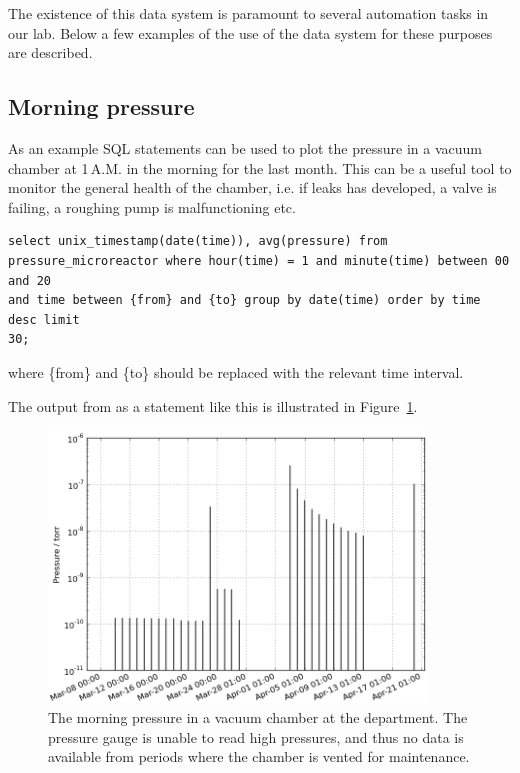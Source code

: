 The existence of this data system is paramount to several automation tasks
in our lab. Below a few examples of the use of the data system for
these purposes are described.

\subsection{Morning pressure}\label{sec:morning_pressure}

As an example SQL statements can be used to plot the pressure in a vacuum
chamber at 1\,A.M. in the morning for the last month. This can be a useful tool
to monitor the general health of the chamber, i.e. if leaks has developed, a
valve is failing, a roughing pump is malfunctioning etc.

\begin{verbatim} 
select unix_timestamp(date(time)), avg(pressure) from
pressure_microreactor where hour(time) = 1 and minute(time) between 00 and 20
and time between {from} and {to} group by date(time) order by time desc limit
30; 
\end{verbatim}
where \{from\}  and \{to\} should be replaced with the
relevant time interval.

The output from as a statement like this is illustrated in
Figure~\ref{fig:morning_pressure}.
\begin{figure}
 \begin{center}
 \includegraphics[width=10cm]{morning_pressure.png}
 \caption{ The morning pressure in a vacuum chamber at the department. The
   pressure gauge is unable to read high pressures, and thus no data is
   available from periods where the chamber is vented for maintenance.
   \label{fig:morning_pressure}
 } 
 \end{center}
\end{figure}

